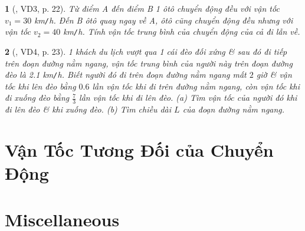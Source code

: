 \documentclass{article}
\newtheorem{baitoan}{}
\begin{document}
\begin{baitoan}[\cite{Van_Quyen_Hanh_Nhu_10_chuyen_Ly}, VD3, p. 22]
	Từ điểm A đến điểm B 1 ôtô chuyển động đều với vận tốc $v_1 = 30$ {\rm km{\tt/}h}. Đến B ôtô quay ngay về A, ôtô cũng chuyển động đều nhưng với vận tốc $v_2 = 40$ {\rm km{\tt/}h}. Tính vận tốc trung bình của chuyển động của cả đi lẫn về.
\end{baitoan}

\begin{baitoan}[\cite{Van_Quyen_Hanh_Nhu_10_chuyen_Ly}, VD4, p. 23]
	1 khách du lịch vượt qua 1 cái đèo đối xứng \& sau đó đi tiếp trên đoạn đường nằm ngang, vận tốc trung bình của người này trên đoạn đường đèo là {\rm2.1 km{\tt/}h}. Biết người đó đi trên đoạn đường nằm ngang mất $2$ giờ \& vận tốc khi lên đèo bằng $0.6$ lần vận tốc khi đi trên đường nằm ngang, còn vận tốc khi đi xuống đèo bằng $\frac{7}{3}$ lần vận tốc khi đi lên đèo. (a) Tìm vận tốc của người đó khi đi lên đèo \& khi xuống đèo. (b) Tìm chiều dài $L$ của đoạn đường nằm ngang.
\end{baitoan}


\section{Vận Tốc Tương Đối của Chuyển Động}


\section{Miscellaneous}


\printbibliography[heading=bibintoc]
	
\end{document}
